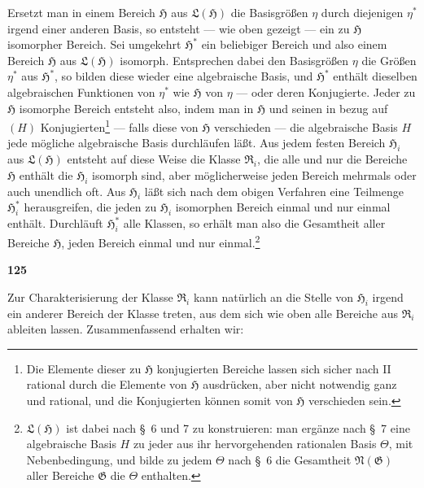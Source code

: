 \documentclass[12pt,a4paper]{article}
\begin{document}
Ersetzt man in einem Bereich $\mathfrak{H}$ aus $\mathfrak{L}(\mathfrak{H})$ die Basisgr\"o\ss en $\eta$ durch diejenigen $\eta^*$ irgend einer anderen Basis, so entsteht --- wie oben gezeigt --- ein zu $\mathfrak{H}$ isomorpher Bereich. Sei umgekehrt $\mathfrak{H}^*$ ein beliebiger Bereich und also einem Bereich $\mathfrak{H}$ aus $\mathfrak{L}(\mathfrak{H})$ isomorph. Entsprechen dabei den Basisgr\"o\ss en $\eta$ die Gr\"o\ss en $\eta^*$ aus $\mathfrak{H}^*$, so bilden diese wieder eine algebraische Basis, und $\mathfrak{H}^*$ enth\"alt dieselben algebraischen Funktionen von $\eta^*$ wie $\mathfrak{H}$ von $\eta$ --- oder deren Konjugierte. Jeder zu $\mathfrak{H}$ isomorphe Bereich entsteht also, indem man in $\mathfrak{H}$ und seinen in bezug auf $(H)$ Konjugierten\footnote{Die Elemente dieser zu $\mathfrak{H}$ konjugierten Bereiche lassen sich sicher nach II rational durch die Elemente von $\mathfrak{H}$ ausdr\"ucken, aber nicht notwendig ganz und rational, und die Konjugierten k\"onnen somit von $\mathfrak{H}$ verschieden sein.} --- falls diese von $\mathfrak{H}$ verschieden --- die algebraische Basis $H$ jede m\"ogliche algebraische Basis durchl\"aufen l\"a\ss t. Aus jedem festen Bereich $\mathfrak{H}_i$ aus $\mathfrak{L}(\mathfrak{H})$ entsteht auf diese Weise die Klasse $\mathfrak{R}_i$, die alle und nur die Bereiche $\mathfrak{H}$ enth\"alt die $\mathfrak{H}_i$ isomorph sind, aber m\"oglicherweise jeden Bereich mehrmals oder auch unendlich oft. Aus $\mathfrak{H}_i$ l\"a\ss t sich nach dem obigen Verfahren eine Teilmenge $\mathfrak{H}_i^*$ herausgreifen, die jeden zu $\mathfrak{H}_i$ isomorphen Bereich einmal und nur einmal enth\"alt. Durchl\"auft $\mathfrak{H}_i^*$ alle Klassen, so erh\"alt man also die Gesamtheit aller Bereiche $\mathfrak{H}$, jeden Bereich einmal und nur einmal.\footnote{$\mathfrak{L}(\mathfrak{H})$ ist dabei nach \S\ 6 und 7 zu konstruieren: man erg\"anze nach \S\ 7 eine algebraische Basis $H$ zu jeder aus ihr hervorgehenden rationalen Basis $\Theta$, mit Nebenbedingung, und bilde zu jedem $\Theta$ nach \S\ 6 die Gesamtheit $\mathfrak{N}(\mathfrak{G})$ aller Bereiche $\mathfrak{G}$ die $\Theta$ enthalten.}

\newpage
\begin{center}
\textbf{125}
\end{center}

Zur Charakterisierung der Klasse $\mathfrak{R}_i$ kann nat\"urlich an die Stelle von $\mathfrak{H}_i$ irgend ein anderer Bereich der Klasse treten, aus dem sich wie oben alle Bereiche aus $\mathfrak{R}_i$ ableiten lassen. Zusammenfassend erhalten wir:
\end{document}

